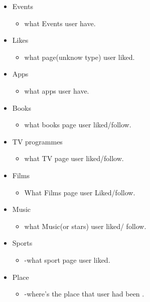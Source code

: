 \begin{itemize}
\item Events
    \begin{itemize}
    \item what Events user have.
    \end{itemize}

\item Likes
    \begin{itemize}
    \item what page(unknow type) user liked.
    \end{itemize}

\item Apps
    \begin{itemize}
    \item what apps user have.
    \end{itemize}

\item Books
    \begin{itemize}
    \item what books page user liked/follow.
    \end{itemize}

\item TV programmes
    \begin{itemize}
    \item what TV page user liked/follow.
    \end{itemize}

\item Films
    \begin{itemize}
    \item What Films page user Liked/follow.
    \end{itemize}

\item Music
    \begin{itemize}
    \item what Music(or stars) user liked/ follow.
    \end{itemize}

\item Sports
    \begin{itemize}
    \item -what sport page user liked.
    \end{itemize}

\item Place
    \begin{itemize}
     \item -where's the place that user had been .
     \end{itemize}
\end{itemize}
